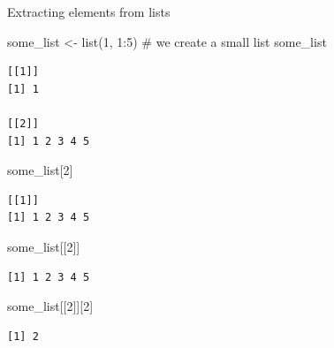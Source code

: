 \documentclass[
  ignorenonframetext,
  aspectratio=169,
]{beamer}
\newenvironment{Shaded}{\begin{snugshade}}{\end{snugshade}}
\newcommand{\CommentTok}[1]{\textcolor[rgb]{0.37,0.37,0.37}{#1}}
\newcommand{\DecValTok}[1]{\textcolor[rgb]{0.68,0.00,0.00}{#1}}
\newcommand{\FunctionTok}[1]{\textcolor[rgb]{0.28,0.35,0.67}{#1}}
\newcommand{\NormalTok}[1]{\textcolor[rgb]{0.00,0.23,0.31}{#1}}
\newcommand{\OtherTok}[1]{\textcolor[rgb]{0.00,0.23,0.31}{#1}}
\newcommand{\SpecialCharTok}[1]{\textcolor[rgb]{0.37,0.37,0.37}{#1}}
\begin{document}
\begin{frame}[fragile]{Extracting elements from lists}
\protect{}\label{extracting-elements-from-lists}
\footnotesize

\begin{Shaded}
\begin{Highlighting}[]
\NormalTok{some\_list }\OtherTok{\textless{}{-}} \FunctionTok{list}\NormalTok{(}\DecValTok{1}\NormalTok{, }\DecValTok{1}\SpecialCharTok{:}\DecValTok{5}\NormalTok{) }\CommentTok{\# we create a small list}
\NormalTok{some\_list}
\end{Highlighting}
\end{Shaded}

\begin{verbatim}
[[1]]
[1] 1

[[2]]
[1] 1 2 3 4 5
\end{verbatim}

\begin{Shaded}
\begin{Highlighting}[]
\NormalTok{some\_list[}\DecValTok{2}\NormalTok{]}
\end{Highlighting}
\end{Shaded}

\begin{verbatim}
[[1]]
[1] 1 2 3 4 5
\end{verbatim}

\begin{Shaded}
\begin{Highlighting}[]
\NormalTok{some\_list[[}\DecValTok{2}\NormalTok{]]}
\end{Highlighting}
\end{Shaded}

\begin{verbatim}
[1] 1 2 3 4 5
\end{verbatim}

\begin{Shaded}
\begin{Highlighting}[]
\NormalTok{some\_list[[}\DecValTok{2}\NormalTok{]][}\DecValTok{2}\NormalTok{]}
\end{Highlighting}
\end{Shaded}

\begin{verbatim}
[1] 2
\end{verbatim}

\normalsize
\end{frame}
\end{document}
